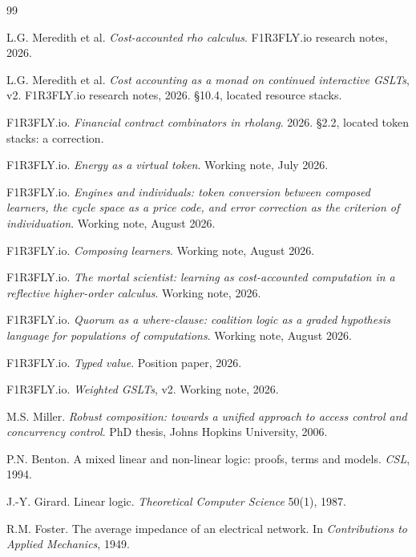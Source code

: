 \documentclass[11pt]{article}
\theoremstyle{plain}
\theoremstyle{definition}
\theoremstyle{remark}
\begin{document}
\begin{thebibliography}{99}

 L.G. Meredith et al.
\newblock \emph{Cost-accounted rho calculus}. F1R3FLY.io research notes, 2026.

 L.G. Meredith et al.
\newblock \emph{Cost accounting as a monad on continued interactive GSLTs},
v2. F1R3FLY.io research notes, 2026. \S10.4, located resource stacks.

 F1R3FLY.io.
\newblock \emph{Financial contract combinators in rholang}. 2026.
\S2.2, located token stacks: a correction.

 F1R3FLY.io.
\newblock \emph{Energy as a virtual token}. Working note, July 2026.

 F1R3FLY.io.
\newblock \emph{Engines and individuals: token conversion between composed
learners, the cycle space as a price code, and error correction as the criterion
of individuation}. Working note, August 2026.

 F1R3FLY.io.
\newblock \emph{Composing learners}. Working note, August 2026.

 F1R3FLY.io.
\newblock \emph{The mortal scientist: learning as cost-accounted computation in
a reflective higher-order calculus}. Working note, 2026.

 F1R3FLY.io.
\newblock \emph{Quorum as a where-clause: coalition logic as a graded hypothesis
language for populations of computations}. Working note, August 2026.

 F1R3FLY.io.
\newblock \emph{Typed value}. Position paper, 2026.

 F1R3FLY.io.
\newblock \emph{Weighted GSLTs}, v2. Working note, 2026.

 M.S. Miller.
\newblock \emph{Robust composition: towards a unified approach to access control
and concurrency control}. PhD thesis, Johns Hopkins University, 2006.

 P.N. Benton.
\newblock A mixed linear and non-linear logic: proofs, terms and models.
\newblock \emph{CSL}, 1994.

 J.-Y. Girard.
\newblock Linear logic. \emph{Theoretical Computer Science} 50(1), 1987.

 R.M. Foster.
\newblock The average impedance of an electrical network.
\newblock In \emph{Contributions to Applied Mechanics}, 1949.


\end{thebibliography}
\end{document}
